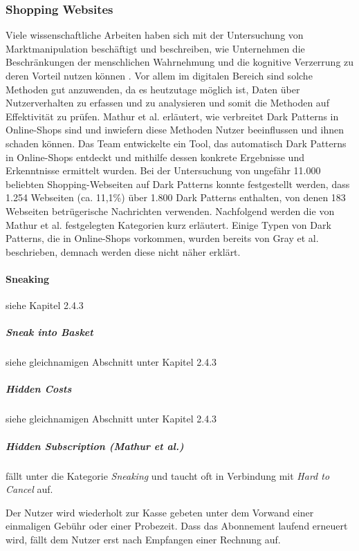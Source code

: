 \documentclass[a4paper]{article}
\begin{document}
\subsubsection{Shopping Websites}
\label{sub:shopping}
Viele wissenschaftliche Arbeiten haben sich mit der Untersuchung von Marktmanipulation beschäftigt und beschreiben, wie Unternehmen die Beschränkungen der menschlichen Wahrnehmung und die kognitive Verzerrung zu deren Vorteil nutzen können \cite{mathur}\cite{narayanan}. Vor allem im digitalen Bereich sind solche Methoden gut anzuwenden, da es heutzutage möglich ist, Daten über Nutzerverhalten zu erfassen und zu analysieren und somit die Methoden auf Effektivität zu prüfen.\newline\newline
Mathur et al. erläutert, wie verbreitet Dark Patterns in Online-Shops sind und inwiefern diese Methoden Nutzer beeinflussen und ihnen schaden können. Das Team entwickelte ein Tool, das automatisch Dark Patterns in Online-Shops entdeckt und mithilfe dessen konkrete Ergebnisse und Erkenntnisse ermittelt wurden. Bei der Untersuchung von ungefähr 11.000 beliebten Shopping-Webseiten auf Dark Patterns konnte festgestellt werden, dass 1.254 Webseiten (ca. 11,1\%) über 1.800 Dark Patterns enthalten, von denen 183 Webseiten betrügerische Nachrichten verwenden.\newline\newline     
Nachfolgend werden die von Mathur et al. festgelegten Kategorien kurz erläutert. Einige Typen von Dark Patterns, die in Online-Shops vorkommen, wurden bereits von Gray et al. beschrieben, demnach werden diese nicht näher erklärt. 

\paragraph{Sneaking}
siehe Kapitel 2.4.3

\subparagraph{Sneak into Basket}
siehe gleichnamigen Abschnitt unter Kapitel 2.4.3

\subparagraph{Hidden Costs}
siehe gleichnamigen Abschnitt unter Kapitel 2.4.3

\subparagraph{Hidden Subscription (Mathur et al.)} fällt unter die Kategorie \textit{Sneaking} und taucht oft in Verbindung mit \textit{Hard to Cancel} auf. 

Der Nutzer wird wiederholt zur Kasse gebeten unter dem Vorwand einer einmaligen Gebühr oder einer Probezeit. Dass das Abonnement laufend erneuert wird, fällt dem Nutzer erst nach Empfangen einer Rechnung auf.  
\end{document}
